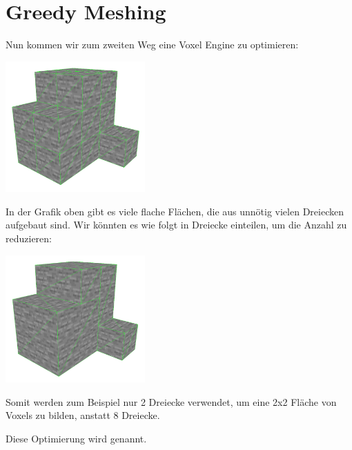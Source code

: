 \section{Greedy Meshing}

Nun kommen wir zum zweiten Weg eine Voxel Engine
zu optimieren:

\begin{center}
\includegraphics[width=0.4\textwidth]{../assets/greedy/stone_simple.png}
\end{center}

In der Grafik oben gibt es viele flache Flächen,
die aus unnötig vielen Dreiecken aufgebaut sind.
Wir könnten es wie folgt in Dreiecke einteilen,
um die Anzahl zu reduzieren:

\begin{center}
\includegraphics[width=0.4\textwidth]{../assets/greedy/stone_greedy.png}
\end{center}

Somit werden zum Beispiel nur 2 Dreiecke verwendet,
um eine 2x2 Fläche von Voxels zu bilden,
anstatt 8 Dreiecke.

Diese Optimierung wird  genannt.

{  }

\pagebreak

{  }

